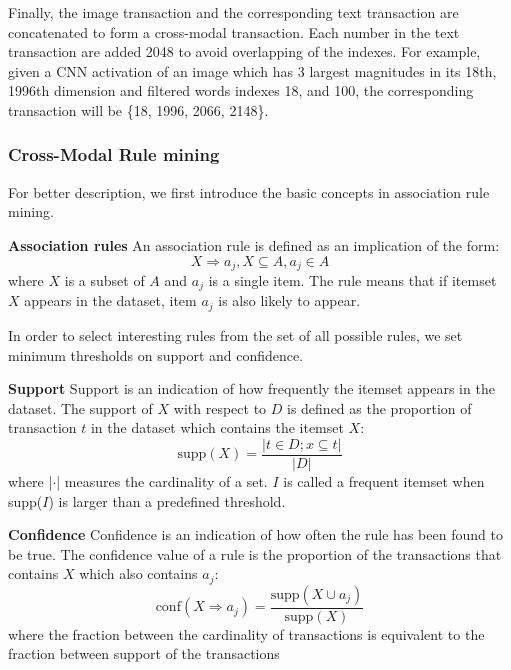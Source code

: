 \documentclass[sigconf]{acmart}
\begin{document}
Finally, the image transaction and the corresponding text transaction are concatenated to form a cross-modal transaction. Each number in the text transaction are added 2048 to avoid overlapping of the indexes. For example, given a CNN activation of an image which has 3 largest magnitudes in its 18th, 1996th dimension and filtered words indexes 18, and 100, the corresponding transaction  will be \{18, 1996, 2066, 2148\}.

\subsubsection{Cross-Modal Rule mining} For better description, we first introduce the basic concepts in association rule mining. 

\textbf{Association rules}
 An association rule is defined as an implication of the form: 
 \begin{equation}
      X\Rightarrow a_j, X\subseteq{A}, a_j \in{A}
 \end{equation}
 where $X$ is a subset of $A$ and $a_j$ is a single item. The rule means that if itemset $X$ appears in the dataset, item $a_j$ is also likely to appear.
 
In order to select interesting rules from the set of all possible rules, we set minimum thresholds on support and confidence.

\textbf{Support} Support is an indication of how frequently the itemset appears in the dataset. The support of $X$ with respect to $D$ is defined as the proportion of transaction $t$ in the dataset  which contains the itemset $X$:
\begin{equation}
    \text{supp}(X)=\frac{|t\in D;x\subseteq{t}|}{|D|}
\end{equation}
where |$\cdot$| measures the cardinality of a set. $I$ is called a frequent itemset when supp($I$) is larger than a predefined threshold.

\textbf{Confidence} Confidence is an indication of how often the rule has been found to be true. The confidence value of a rule is the proportion of the transactions that contains  $X$ which also contains $a_j$:
\begin{equation}
   \text{conf}(X\Rightarrow a_j)=\frac{\text{supp}(X\cup a_j)}{\text{supp}(X)}        
\end{equation}
where the fraction between the cardinality of transactions is equivalent to the fraction between support of the transactions 
 
\end{document}
